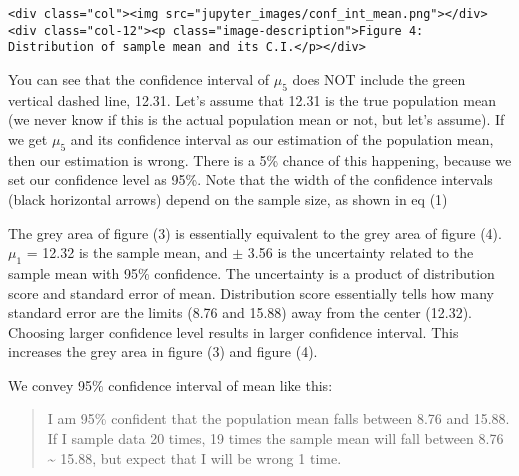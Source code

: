 \documentclass[11pt]{article}
\begin{document}
\hypertarget{fig4}{}
\begin{verbatim}
<div class="col"><img src="jupyter_images/conf_int_mean.png"></div>
<div class="col-12"><p class="image-description">Figure 4: Distribution of sample mean and its C.I.</p></div>
\end{verbatim}

You can see that the confidence interval of {\(\mu_5\)} does NOT include
the {green vertical dashed line}, 12.31. Let's assume that 12.31 is the
true population mean (we never know if this is the actual population
mean or not, but let's assume). If we get {\(\mu_5\)} and its confidence
interval as our estimation of the population mean, then our estimation
is wrong. There is a 5\% chance of this happening, because we set our
confidence level as 95\%. Note that the width of the confidence
intervals (black horizontal arrows) depend on the sample size, as shown
in eq (1)

The grey area of figure (3) is essentially equivalent to the grey area
of figure (4). \(\mu_1\) = 12.32 is the sample mean, and \(\pm\) 3.56 is
the uncertainty related to the sample mean with 95\% confidence. The
uncertainty is a product of distribution score and standard error of
mean. Distribution score essentially tells how many standard error are
the limits (8.76 and 15.88) away from the center (12.32). Choosing
larger confidence level results in larger confidence interval. This
increases the grey area in figure (3) and figure (4).

We convey 95\% confidence interval of mean like this:

\begin{quote}
I am 95\% confident that the population mean falls between 8.76 and
15.88. If I sample data 20 times, 19 times the sample mean will fall
between 8.76 \textasciitilde{} 15.88, but expect that I will be wrong 1
time.
\end{quote}

\hypertarget{dist_stats}{}
\end{document}
